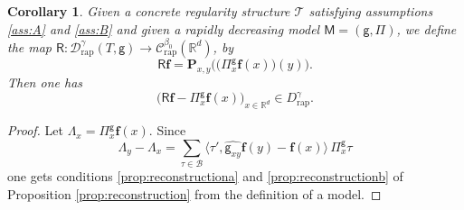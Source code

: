 \documentclass[10pt]{amsart}
\theoremstyle{plain}
\newtheorem{cor}[thm]{Corollary}
\theoremstyle{definition}
\newcommand{\bsf}{\boldsymbol{f}}
\newcommand{\rap}{\mathrm{rap}}
\newcommand{\bfP}{\mathbf{P}}
\newcommand{\reR}{\boldsymbol{\mathsf{R}}}
\newcommand{\sfM}{\mathsf{M}}
\newcommand{\sfg}{\mathsf{g}}
\newcommand{\sfPi}{\mathsf{\Pi}}
\newcommand{\scrT}{\mathscr{T}}
\newcommand{\bbR}{\mathbb{R}}
\newcommand{\mcB}{\mathcal{B}}
\newcommand{\mcC}{\mathcal{C}}
\newcommand{\mcD}{\mathcal{D}}
\begin{document}
\begin{cor}\label{canonical reconstruction}
Given a concrete regularity structure $\scrT$ satisfying assumptions \eqref{ass:A} and \eqref{ass:B} and given a rapidly decreasing model $\sfM=(\sfg,\sfPi)$, we define the map \hbox{$\reR : \mcD_\rap^\gamma(T,\sfg)\to \mcC_\rap^{\beta_0}(\bbR^d)$}, by
\[
\reR\bsf = \bfP_{x,y}\bigl(\bigl(\sfPi_x^\sfg\bsf(x)\bigr)(y)\bigr).
\]
Then one has
\[
\bigl(\reR\bsf-\sfPi_x^\sfg\bsf(x)\bigr)_{x\in\bbR^d} \in D_\rap^\gamma.
\]
\end{cor}

\begin{proof}
Let $\Lambda_x=\sfPi_x^\sfg\bsf(x)$. Since
\[
\Lambda_y-\Lambda_x = \sum_{\tau\in\mcB} \big\langle\tau',\widehat{\sfg_{xy}}\bsf(y)-\bsf(x)\big\rangle\,\sfPi_x^\sfg\tau
\]
one gets conditions \eqref{prop:reconstructiona} and \eqref{prop:reconstructionb} of Proposition \ref{prop:reconstruction} from the definition of a model.
\end{proof}
\end{document}
